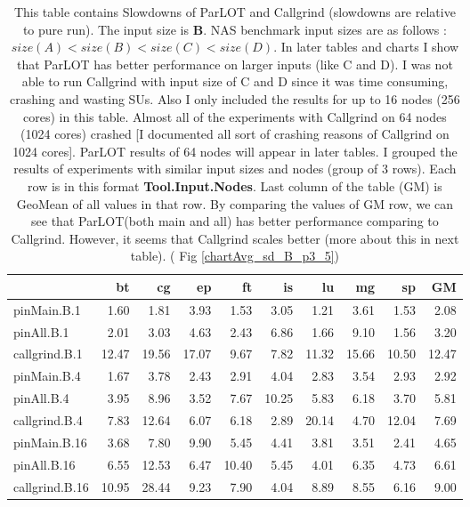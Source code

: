 \begin{table*}[]
 \caption{This table contains Slowdowns of ParLOT and Callgrind (slowdowns are relative to pure run). The input size is \textbf{B}.  NAS benchmark input sizes are as follows : $size(A) < size(B) < size (C) < size(D) $. In later tables and charts I show that ParLOT has better performance on larger inputs (like C and D). I was not able to run Callgrind with input size of C and D since it was time consuming, crashing and wasting SUs. Also I only included the results for up to 16 nodes (256 cores) in this table. Almost all of the experiments with Callgrind on 64 nodes (1024 cores) crashed [I documented all sort of crashing reasons of Callgrind on 1024 cores]. ParLOT results of 64 nodes will appear in later tables. I grouped the results of experiments with similar input sizes and nodes (group of 3 rows). Each row is in this format \textbf{Tool.Input.Nodes}. Last column of the table (GM) is GeoMean of all values in that row. By comparing the values of GM row, we can see that ParLOT(both main and all) has better performance comparing to Callgrind. However, it seems that Callgrind scales better (more about this in next table). ( Fig \ref{chartAvg_sd_B_p3_5})}
 \label{sd_pMpAcg_B_int_p3.5}
\begin{center}
\begin{tabular}{|l|rrrrrrrr|r|}
\hline
                &    bt &    cg &    ep &    ft &    is &    lu &    mg &    sp &    GM \\
\hline
 pinMain.B.1    &  1.60 &  1.81 &  3.93 &  1.53 &  3.05 &  1.21 &  3.61 &  1.53 &  2.08 \\
 pinAll.B.1     &  2.01 &  3.03 &  4.63 &  2.43 &  6.86 &  1.66 &  9.10 &  1.56 &  3.20 \\
 callgrind.B.1  & 12.47 & 19.56 & 17.07 &  9.67 &  7.82 & 11.32 & 15.66 & 10.50 & 12.47 \\
 \hline
 pinMain.B.4    &  1.67 &  3.78 &  2.43 &  2.91 &  4.04 &  2.83 &  3.54 &  2.93 &  2.92 \\
 pinAll.B.4     &  3.95 &  8.96 &  3.52 &  7.67 & 10.25 &  5.83 &  6.18 &  3.70 &  5.81 \\
 callgrind.B.4  &  7.83 & 12.64 &  6.07 &  6.18 &  2.89 & 20.14 &  4.70 & 12.04 &  7.69 \\
 \hline
 pinMain.B.16   &  3.68 &  7.80 &  9.90 &  5.45 &  4.41 &  3.81 &  3.51 &  2.41 &  4.65 \\
 pinAll.B.16    &  6.55 & 12.53 &  6.47 & 10.40 &  5.45 &  4.01 &  6.35 &  4.73 &  6.61 \\
 callgrind.B.16 & 10.95 & 28.44 &  9.23 &  7.90 &  4.04 &  8.89 &  8.55 &  6.16 &  9.00 \\
\hline
\end{tabular}
\end{center}
\end{table*}
